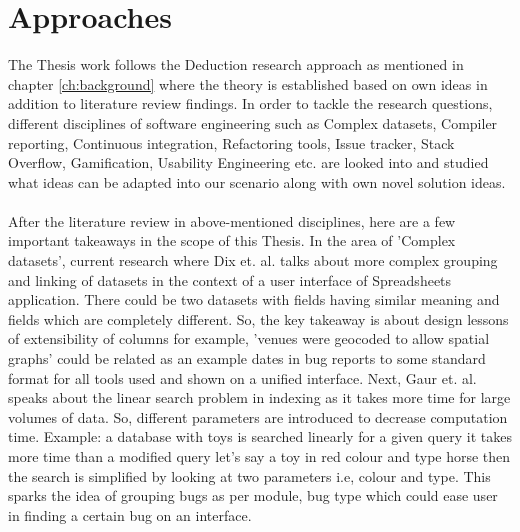 \chapter{Approaches}
\label{ch:approaches}

The Thesis work follows the Deduction research approach as mentioned in chapter \ref{ch:background} where the theory is established based on own ideas in addition to literature review findings. In order to tackle the research questions, different disciplines of software engineering such as Complex datasets, Compiler reporting, Continuous integration, Refactoring tools, Issue tracker, Stack Overflow, Gamification, Usability Engineering etc. are looked into and studied what ideas can be adapted into our scenario along with own novel solution ideas.\\ \\

After the literature review in above-mentioned disciplines, here are a few important takeaways in the scope of this Thesis. In the area of 'Complex datasets', current research where Dix et. al. \cite{Dix} talks about more complex grouping and linking of datasets in the context of a user interface of Spreadsheets application. There could be two datasets with fields having similar meaning and fields which are completely different. So, the key takeaway is about design lessons of extensibility of columns for example, 'venues were geocoded to allow spatial graphs' could be related as an example dates in bug reports to some standard format for all tools used and shown on a unified interface. Next, Gaur et. al. \cite{Gaur} speaks about the linear search problem in indexing as it takes more time for large volumes of data. So, different parameters are introduced to decrease computation time. Example: a database with toys is searched linearly for a given query it takes more time than a modified query let's say a toy in red colour and type horse then the search is simplified by looking at two parameters i.e, colour and type. This sparks the idea of grouping bugs as per module, bug type which could ease user in finding a certain bug on an interface.  \\ \\

